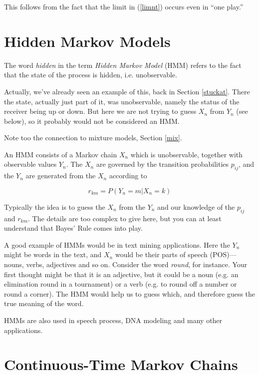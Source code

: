 This follows from the fact that the limit in (\ref{limnt}) occurs even
in ``one play.''

\section{Hidden Markov Models}

The word {\it hidden} in the term {\it Hidden Markov Model} (HMM)
refers to the fact that the state of the process is hidden, i.e.
unobservable.  

Actually, we've already seen an example of this, back in Section
\ref{stuckat}.  There the state, actually just part of it, was
unobservable, namely the status of the receiver being up or down.  But
here we are not trying to guess $X_n$ from $Y_n$ (see below), so it
probably would not be considered an HMM. 

Note too the connection to mixture models, Section \ref{mix}.

An HMM consists of a Markov chain $X_n$ which is unobservable, together
with observable values $Y_n$.  The $X_n$ are governed by the transition
probabilities $p_{ij}$, and the $Y_n$ are generated from the $X_n$
according to

\begin{equation}
r_{km} = P(Y_n = m | X_n = k)
\end{equation}

Typically the idea is to guess the $X_n$ from the $Y_n$ and our
knowledge of the $p_{ij}$ and $r_{km}$.  The details are too complex to
give here, but you can at least understand that Bayes' Rule comes into
play.

A good example of HMMs would be in text mining applications.  Here the
$Y_n$ might be words in the text, and $X_n$ would be their parts of
speech (POS)---nouns, verbs, adjectives and so on.  Consider the word
{\it round}, for instance.  Your first thought might be that it is an
adjective, but it could be a noun (e.g. an elimination round in a
tournament) or a verb (e.g. to round off a number or round a corner).
The HMM would help us to guess which, and therefore guess the true
meaning of the word.  

HMMs are also used in speech process, DNA modeling and many other
applications.

\section{Continuous-Time Markov Chains}
\label{continmc}

